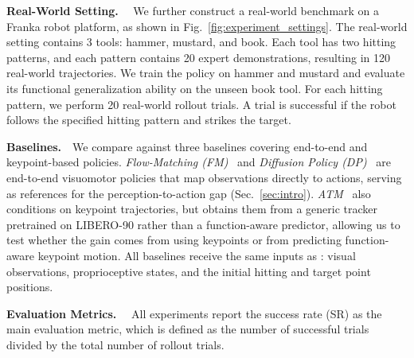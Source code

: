 \textbf{Real-World Setting.}~~
We further construct a real-world benchmark on a Franka robot platform, as shown in Fig.~\ref{fig:experiment_settings}. 
The real-world setting contains 3 tools: hammer, mustard, and book. 
Each tool has two hitting patterns, and each pattern contains 20 expert demonstrations, resulting in 120 real-world trajectories.
We train the policy on hammer and mustard and evaluate its functional generalization ability on the unseen book tool. 
For each hitting pattern, we perform 20 real-world rollout trials. A trial is successful if the robot follows the specified hitting pattern and strikes the target.

\textbf{Baselines.}~~We compare \algoname{} against three baselines covering end-to-end and keypoint-based policies. \textit{Flow-Matching (FM)}~\cite{lipmanflow} and \textit{Diffusion Policy (DP)}~\cite{chi2025diffusion} are end-to-end visuomotor policies that map observations directly to actions, serving as references for the perception-to-action gap (Sec.~\ref{sec:intro}). \textit{ATM}~\cite{wen2023any} also conditions on keypoint trajectories, but obtains them from a generic tracker pretrained on LIBERO-90 rather than a function-aware predictor, allowing us to test whether the gain comes from using keypoints or from predicting function-aware keypoint motion. All baselines receive the same inputs as \algoname{}: visual observations, proprioceptive states, and the initial hitting and target point positions.

\textbf{Evaluation Metrics.}~~
All experiments report the success rate (SR) as the main evaluation metric, which is defined as the number of successful trials divided by the total number of rollout trials.

